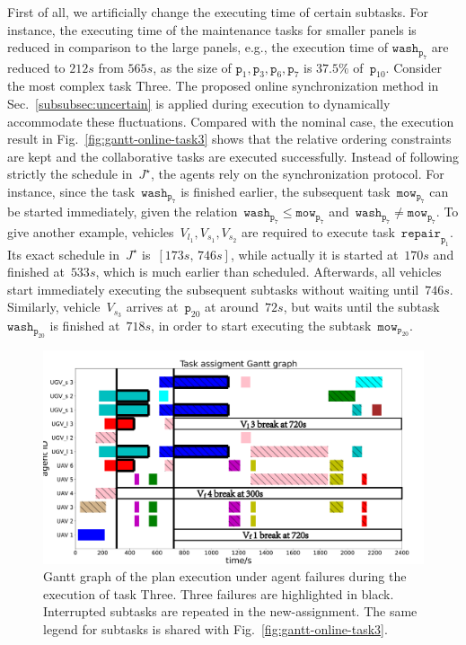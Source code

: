First of all, we artificially change the executing time of certain subtasks.
For instance, the executing time of the maintenance tasks for smaller panels
is reduced in comparison to the large panels, e.g., the execution time
of $\texttt{wash}_{\texttt{p}_7}$ are reduced to $212s$ from $565s$, as the size
of $\texttt{p}_1,\texttt{p}_3,\texttt{p}_6,\texttt{p}_7$ is $37.5\%$
of~$\texttt{p}_{10}$.
Consider the most complex task Three.
The proposed online synchronization method in Sec.~\ref{subsubsec:uncertain}
is applied during execution to dynamically accommodate these fluctuations.
Compared with the nominal case,
the execution result in Fig.~\ref{fig:gantt-online-task3} shows that the relative
ordering constraints are kept and the collaborative tasks are executed successfully.
Instead of following strictly the schedule in~$J^\star$, the agents rely on the
synchronization protocol.
For instance, since the task~$\texttt{wash}_{\texttt{p}_7}$ is finished earlier,
the subsequent task~$\texttt{mow}_{\texttt{p}_7}$ can be started immediately,
given the relation~$\texttt{wash}_{\texttt{p}_7} \leq \texttt{mow}_{\texttt{p}_7}$
and~$\texttt{wash}_{\texttt{p}_7} \neq \texttt{mow}_{\texttt{p}_7}$.
To give another example, vehicles~$V_{l_1}, V_{s_1},V_{s_2}$ are required to execute
task~$\texttt{repair}_{\texttt{p}_1}$.
Its exact schedule in~$J^\star$ is~$[173s,\, 746s]$, while actually it is started
at~$170s$ and finished at~$533s$, which is much earlier than scheduled.
Afterwards, all vehicles start immediately executing the subsequent subtasks
without waiting until~$746s$.
Similarly, vehicle~$V_{s_3}$ arrives at~$\texttt{p}_{20}$ at around~$72s$, but waits until
the subtask~$\texttt{wash}_{\texttt{p}_{20}}$ is finished at~$718s$,
in order to start executing the subtask~$\texttt{mow}_{\texttt{P}_{20}}$.
\begin{figure}[t!]
	\includegraphics[scale=0.18]{figures/simulation/onlineadaptive/gantt_final_rebuild.pdf}
	\centering
	\caption{
Gantt graph of the plan execution under agent failures during the execution of task Three.
Three failures are highlighted in black.
Interrupted subtasks are repeated in the new-assignment.
The same legend for subtasks is shared with Fig.~\ref{fig:gantt-online-task3}.}
        \label{fig:online-failure-task3}
\end{figure}


